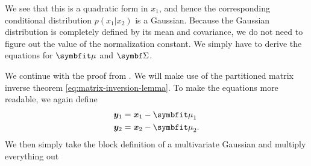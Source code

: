 We see that this is a quadratic form in $x_1$, and hence the corresponding
conditional distribution $p(x_1 | x_2)$ is a Gaussian. 
Because the Gaussian distribution is completely defined by its mean and
covariance, we do not need to figure out the value of the normalization
constant. We simply have to derive the equations for $\vmu$ and $\mSigma$.






We continue with the proof from \cite{murphy2012machine}. We will make use of
the partitioned matrix inverse theorem \autoref{eq:matrix-inversion-lemma}.
To make the equations more
readable, we again define
\begin{align}
    \vy_1 &= \vx_1 - \vmu_1 \\
    \vy_2 &= \vx_2 - \vmu_2.
\end{align}
We then simply take the block definition of a multivariate Gaussian and
multiply everything out

